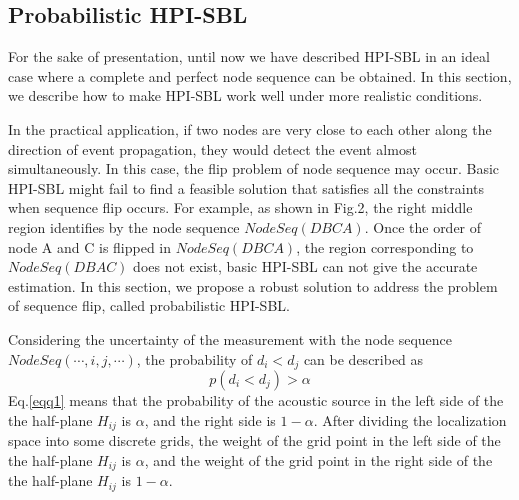 



\subsection{Probabilistic HPI-SBL}

For the sake of presentation, until now we have described HPI-SBL in an ideal case where a complete and perfect node sequence can be obtained. 
In this section, we describe how to make HPI-SBL work well under more realistic conditions. 

In the practical application, if two nodes are very close to each other along the direction of event propagation, they would detect the event almost simultaneously. 
In this case, the flip problem of node sequence may occur. 
Basic HPI-SBL might fail to find a feasible solution that satisfies all the constraints when sequence flip occurs. 
For example, as shown in Fig.2, the right middle region identifies by the node sequence $NodeSeq (D B C A)$. 
Once the order of node A and C is flipped in $NodeSeq (D B C A)$, the region corresponding to $NodeSeq (D B A C)$  does not exist, basic HPI-SBL can not give the accurate estimation.
In this section, we propose a robust solution to address the problem of sequence flip, called probabilistic HPI-SBL.

 Considering the uncertainty of the measurement with the node sequence $NodeSeq( \cdots ,i,j, \cdots )$, the probability of ${d_i} < {d_j}$ can be described as  
 \begin{equation}\label{eqq1}
 p({d_i} < {d_j})>\alpha
 \end{equation}
Eq.\ref{eqq1} means that the probability of the acoustic source in the left side of the the half-plane $H_{ij}$ is $\alpha$, and the right side is $1-\alpha$. 
After dividing the localization space into some discrete grids, the weight of the grid point in the left side of the the half-plane $H_{ij}$ is $\alpha$, and the weight of the grid point in the right side of the the half-plane $H_{ij}$ is $1-\alpha$.


